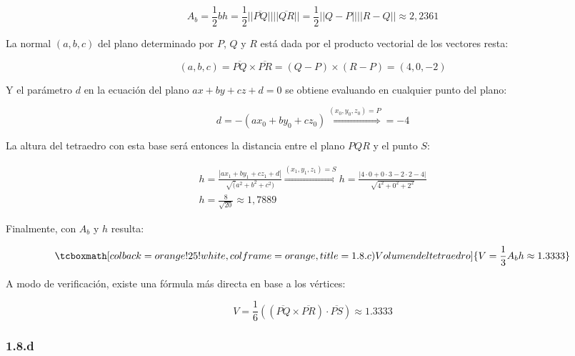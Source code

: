 \documentclass{article}
\begin{document}
\begin{equation}
A_b = \frac{1}{2} b h = \frac{1}{2} ||\overline{PQ}|| ||\overline{QR}|| = \frac{1}{2} ||Q-P|| ||R-Q|| \approx 2,2361
\end{equation}

La normal $(a,b,c)$ del plano determinado por $P$, $Q$ y $R$ está dada por el producto vectorial de los vectores resta:

\begin{equation}
(a,b,c) = \overline{PQ} \times \overline{PR} = (Q-P) \times (R-P) = (4, 0, -2)
\end{equation}

Y el parámetro $d$ en la ecuación del plano $a x + b y + c z + d = 0$ se obtiene evaluando en cualquier punto del plano:

\begin{equation}
d = -(a x_0 + b y_0 + c z_0) \overset{(x_0, y_0, z_0) = P}{\Rightarrow} = -4
\end{equation}

La altura del tetraedro con esta base será entonces la distancia entre el plano $PQR$ y el punto $S$:

\begin{subequations}
\begin{align}
h = \frac{|a x_1 + b y_1 + c z_1 + d|}{\sqrt(a^2 + b^2 + c^2)} \overset{(x_1, y_1, z_1) = S}{\Longrightarrow} h = \frac{|4 \cdot 0 + 0 \cdot 3 -2 \cdot 2 -4|}{\sqrt{4^2 + 0^2 + 2^2}} \\
h = \frac{8}{\sqrt{20}} \approx 1,7889
\end{align}
\end{subequations}

Finalmente, con $A_b$ y $h$ resulta:

\begin{equation}
\tcboxmath[colback=orange!25!white,colframe=orange, title=1.8.c) Volumen del tetraedro]
{ V = \frac{1}{3} A_b h \approx 1.3333 }
\end{equation}

A modo de verificación, existe una fórmula más directa en base a los vértices:

\begin{equation}
V = \frac{1}{6} ((\overline{PQ} \times \overline{PR}) \cdot \overline{PS}) \approx 1.3333
\end{equation}

\subsubsection*{1.8.d}
\label{subsubsec:1.8.d}
\end{document}
